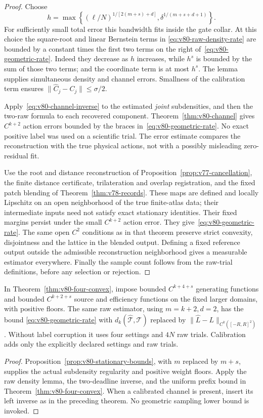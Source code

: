 \begin{proof}
Choose
\[
 h=\max\left\{(\ell/N)^{1/[2(m+s)+d]},
                   \delta^{1/(m+s+d+1)}\right\}.
\]
For sufficiently small total error this bandwidth fits inside the gate
collar.  At this choice the square-root and linear Bernstein terms in
\eqref{eq:v80-raw-density-rate} are bounded by a constant times the
first two terms on the right of~\eqref{eq:v80-geometric-rate}.
Indeed they decrease as $h$ increases, while $h^s$ is bounded by the
sum of those two terms; and the coordinate term is at most $h^s$.
The lemma supplies simultaneous density and channel errors.  Smallness
of the calibration term ensures $\|\widehat C_j-C_j\|\le\sigma/2$.

Apply~\eqref{eq:v80-channel-inverse} to the estimated \emph{joint}
subdensities, and then the two-raw formula to each recovered component.
Theorem~\ref{thm:v80-channel} gives $C^{k+2}$ action errors bounded
by the braces in~\eqref{eq:v80-geometric-rate}.  No exact positive
label was used on a scientific trial.  The error estimate compares the
reconstruction with the true physical actions, not with a possibly
misleading zero-residual fit.

Use the root and distance reconstruction of
Proposition~\ref{prop:v77-cancellation}, the finite distance certificate,
trilateration and overlap registration, and the fixed patch blending
of Theorem~\ref{thm:v78-records}.  These maps are defined and locally
Lipschitz on an open neighborhood of the true finite-atlas data; their
intermediate inputs need not satisfy exact stationary identities.
Their fixed margins persist under the small $C^{k+2}$ action error.
They give~\eqref{eq:v80-geometric-rate}.  The same open $C^2$
conditions as in that theorem preserve strict convexity, disjointness
and the lattice in the blended output.  Defining a fixed reference
output outside the admissible reconstruction neighborhood gives a
measurable estimator everywhere.  Finally the sample count follows
from the raw-trial definitions, before any selection or rejection.
\end{proof}

\begin{corollary}
\label{cor:v80-finite-convex}
In Theorem~\ref{thm:v80-four-convex}, impose bounded
$C^{k+4+s}$ generating functions and bounded $C^{k+2+s}$ source and
efficiency functions on the fixed larger domains, with positive floors.
The same raw estimator, using $m=k+2,d=2$, has the bound
\eqref{eq:v80-geometric-rate} with
$d_k(\widehat{\mathcal T},\mathcal T)$ replaced by
$\|\widehat L-L\|_{C^k([-R,R]^2)}$.  Without label corruption it
uses four settings and $4N$ raw trials.  Calibration adds only the
explicitly declared settings and raw trials.
\end{corollary}
\begin{proof}
Proposition~\ref{prop:v80-stationary-bounds}, with $m$ replaced by
$m+s$, supplies the actual subdensity regularity and positive weight
floors.  Apply the raw density lemma, the two-deadline inverse, and the
uniform prefix bound in Theorem~\ref{thm:v80-four-convex}.  When a
calibrated channel is present, insert its left inverse as in the
preceding theorem.  No geometric sampling lower bound is invoked.
\end{proof}
